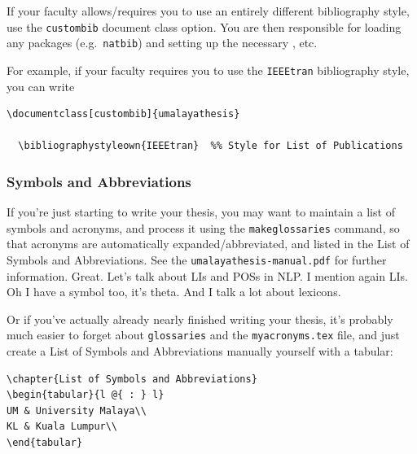 If your faculty allows/requires you to use an entirely different bibliography style, use the \texttt{custombib} document class option. You are then responsible for loading any packages (e.g.~\texttt{natbib}) and setting up the necessary \verb||, etc.

For example, if your faculty requires you to use the \texttt{IEEEtran} bibliography style, you can write

\begin{lstlisting}[language={[LaTeX]TeX},emph={\bibliographystyleown},emphstyle=\bfseries]
  \documentclass[custombib]{umalayathesis}
  
  \bibliographystyleown{IEEEtran}  %% Style for List of Publications
\end{lstlisting}



\subsubsection{Symbols and Abbreviations}

If you're just starting to write your thesis, you may want to maintain a list of symbols and acronyms, and process it using the \texttt{makeglossaries} command, so that acronyms are automatically expanded/abbreviated, and listed in the List of Symbols and Abbreviations. See the \texttt{umalayathesis-manual.pdf} for further information.
Great. Let's talk about \glspl{LI} and \glspl{POS} in \gls{NLP}. I mention again \glspl{LI}. Oh I have a symbol too, it's \gls{theta}. And I talk a lot about \glspl{lexicon}.

Or if you've actually already nearly finished writing your thesis, it's probably much easier to forget about \texttt{glossaries} and the \texttt{myacronyms.tex} file, and just create a List of Symbols and Abbreviations manually yourself with a tabular:

\begin{lstlisting}[language={[LaTeX]TeX},emph={\chapter},emphstyle=\bfseries]
\chapter{List of Symbols and Abbreviations}
\begin{tabular}{l @{ : } l}
UM & University Malaya\\
KL & Kuala Lumpur\\
\end{tabular}
\end{lstlisting}

